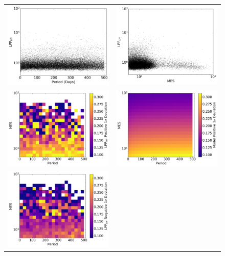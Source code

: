 \begin{figure}[hp]
\centering
\begin{tabular}{cc}
\includegraphics[width=0.485\linewidth]{ScoreFig-1.pdf} &
\includegraphics[width=0.485\linewidth]{ScoreFig-2.pdf} \\
\includegraphics[width=0.485\linewidth]{ScoreFig-3.pdf} &
\includegraphics[width=0.485\linewidth]{ScoreFig-4.pdf} \\
\includegraphics[width=0.485\linewidth]{ScoreFig-5.pdf} &

\end{tabular}
\end{figure}
